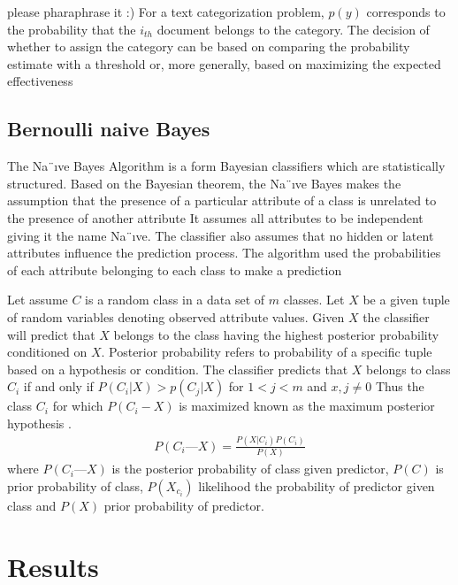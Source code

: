 \documentclass[conference]{IEEEtran}
\begin{document}
{\color{blue}
{\color{red} please pharaphrase it :) }
For a text categorization problem, $p(y)$ corresponds to the probability that the $i_{th}$ document belongs to
the category. The decision of whether to assign the category can be based on comparing the probability estimate
with a threshold or, more generally, based on maximizing
the expected effectiveness \cite{LR}



}
	
	
	
	

\subsection{Bernoulli naive Bayes}
The Na¨ıve Bayes Algorithm is a form Bayesian classifiers
which are statistically structured. Based on the Bayesian theorem,
the Na¨ıve Bayes makes the assumption that the presence
of a particular attribute of a class is unrelated to the presence of
another attribute \cite{naiveB}
It assumes all attributes to be independent
giving it the name Na¨ıve. The classifier also assumes that no
hidden or latent attributes influence the prediction process. The
algorithm used the probabilities of each attribute belonging
to each class to make a prediction \cite{naiveB}



Let assume $C$ is a random class in a data set of $m$ classes.
Let $X$ be a given tuple of random variables denoting observed
attribute values. Given $X$ the classifier will predict that $X$
belongs to the class having the highest posterior probability
conditioned on $X$. Posterior probability refers to probability
of a specific tuple based on a hypothesis or condition. The
classifier predicts that $X$ belongs to class $C_i$ if and only if
$P(C_i|X) > p(C_j|X) $ for $1<j<m$ and $x,j\neq 0 $  
Thus the class $C_i$ for which $P(C_i -  X)$  is maximized known
as the maximum posterior hypothesis \cite{naiveB}.
\begin{align}
  P(C_i — X) = \frac{P(X|C_i)P(C_i)}{P(X)}
\end{align}
where $P(C_i — X)$ is the posterior probability of class given predictor, $P(C)$ is prior probability of class, $P(X_{c_i})$ likelihood the probability of predictor given class and $P(X)$ prior probability of predictor.



\section{Results}
\end{document}
